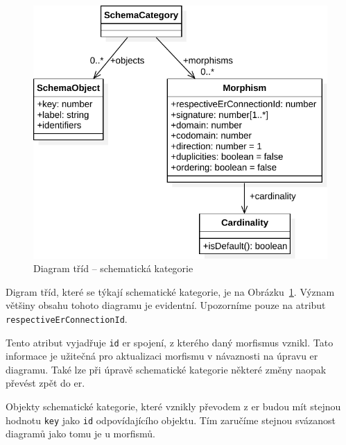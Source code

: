 \begin{figure}[!htb]
  \centering
  \includegraphics[width=\maxwidth{\textwidth}]{../img/diagrams/schemcat-class-diagram.pdf}
  \caption{Diagram tříd -- schematická kategorie}
  \label{fig:schemcat-class-diagram}
\end{figure}

Digram tříd, které se týkají schematické kategorie, je na Obrázku~\ref{fig:schemcat-class-diagram}.
Význam většiny obsahu tohoto diagramu je evidentní.
Upozorníme pouze na atribut \texttt{respectiveErConnectionId}.

Tento atribut vyjadřuje \texttt{id} \acrshort{er} spojení, z kterého daný morfismus vznikl.
Tato informace je užitečná pro aktualizaci morfismu v návaznosti na úpravu \acrshort{er} diagramu.
Také lze při úpravě schematické kategorie některé změny naopak převést zpět do \acrshort{er}.

Objekty schematické kategorie, které vznikly převodem z \acrshort{er} budou mít stejnou hodnotu \texttt{key} jako \texttt{id} odpovídajícího objektu.
Tím zaručíme stejnou svázanost diagramů jako tomu je u morfismů.

